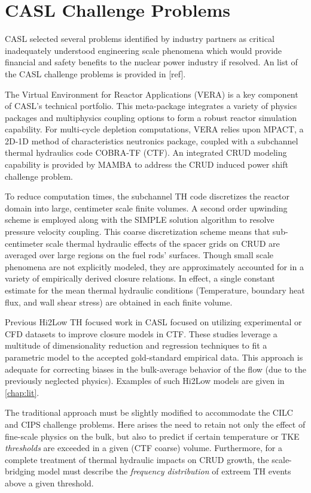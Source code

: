 \section{CASL Challenge Problems}

CASL selected several problems identified by industry partners as critical
inadequately understood engineering scale phenomena which would provide financial and
safety benefits to the nuclear power industry if resolved.  An list of the CASL
challenge problems is provided in [ref].

The Virtual Environment for Reactor Applications (VERA) is a key component of
CASL's technical portfolio.  This meta-package integrates a variety of physics
packages and multiphysics coupling options to form a robust reactor simulation
capability.  For multi-cycle depletion computations, VERA relies upon MPACT, a
2D-1D method of characteristics neutronics package, coupled with a subchannel
thermal hydraulics code COBRA-TF (CTF).  An integrated CRUD modeling capability
is provided by MAMBA to address the CRUD induced power shift challenge problem.

To reduce computation times, the subchannel TH code discretizes the reactor
domain into large, centimeter scale finite volumes.  A second order upwinding
scheme is employed along with the SIMPLE solution algorithm to resolve pressure
velocity coupling.  This coarse discretization scheme means that sub-centimeter scale
thermal hydraulic effects of the spacer grids on CRUD are averaged over
large regions on the fuel rods' surfaces.  Though small scale phenomena are not
explicitly modeled, they are approximately accounted for in a variety of empirically derived
closure relations.  In effect, a single constant estimate for the mean thermal
hydraulic conditions (Temperature, boundary heat flux, and wall shear stress)
are obtained in each finite volume.

Previous Hi2Low TH focused work in CASL focused on utilizing experimental or CFD
datasets to improve closure models in CTF.  These studies leverage a multitude of
dimensionality reduction and regression techniques
to fit a parametric model to the accepted gold-standard empirical data.  This approach
is adequate for correcting biases in the bulk-average behavior of the flow (due to
the previously neglected physics).  Examples of such Hi2Low models are given in
\autoref{chap:lit}.

The traditional approach must be slightly modified to accommodate the CILC and
CIPS challenge problems.  Here arises the need to retain not only the effect of
fine-scale physics on the bulk, but also to predict if certain
temperature or TKE \emph{thresholds} are exceeded in a given (CTF coarse)
volume.  Furthermore, for a complete treatment of thermal hydraulic impacts on
CRUD growth, the scale-bridging model must describe the \emph{frequency
distribution} of extreem TH events above a given threshold.

